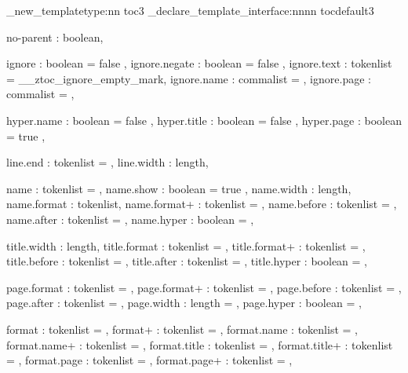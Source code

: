 \gdef\ztoc@leader@type{}
\gdef\ztoc@leader@content{.}
\long\gdef\ztoc@line@end{\par}
\def\ztoc@ignore@level{}

\newlength{\ztoc@rmargin}
\newlength{\ztoc@page@width}
\newlength{\ztoc@leader@sep}
\newlength{\ztoc@leader@raise}
\setlength{\ztoc@rmargin}{\@tocrmarg}
\setlength{\ztoc@leader@sep}{4.5pt}
\setlength{\ztoc@leader@raise}{0pt}
\setlength{\ztoc@page@width}{\@pnumwidth}

\ztex_new_templatetype:nn {toc}{3}
\ztex_declare_template_interface:nnnn {toc}{default}{3}
  {
    no-parent     : boolean,

    ignore        : boolean    = { false },
    ignore.negate : boolean    = { false },
    ignore.text   : tokenlist  = \s__ztoc_ignore_empty_mark,
    ignore.name   : commalist  = { },
    ignore.page   : commalist  = { },

    hyper.name    : boolean    = { false },
    hyper.title   : boolean    = { false },
    hyper.page    : boolean    = { true },

    line.end      : tokenlist  = \ztoc@line@end,
    line.width    : length,

    name          : tokenlist  = { },
    name.show     : boolean    = { true },
    name.width    : length,
    name.format   : tokenlist,
    name.format+  : tokenlist  = { },
    name.before   : tokenlist  = { },
    name.after    : tokenlist  = { },
    name.hyper    : boolean    = ,

    title.width   : length,
    title.format  : tokenlist  = { },
    title.format+ : tokenlist  = { },
    title.before  : tokenlist  = { },
    title.after   : tokenlist  = { },
    title.hyper   : boolean    = ,

    page.format   : tokenlist  = \normalfont\normalcolor,
    page.format+  : tokenlist  = { },
    page.before   : tokenlist  = { },
    page.after    : tokenlist  = { },
    page.width    : length     = \ztoc@page@width,
    page.hyper    : boolean    = ,

    format        : tokenlist  = { },
    format+       : tokenlist  = { },
    format.name   : tokenlist  = ,
    format.name+  : tokenlist  = ,
    format.title  : tokenlist  = ,
    format.title+ : tokenlist  = ,
    format.page   : tokenlist  = ,
    format.page+  : tokenlist  = ,

}
